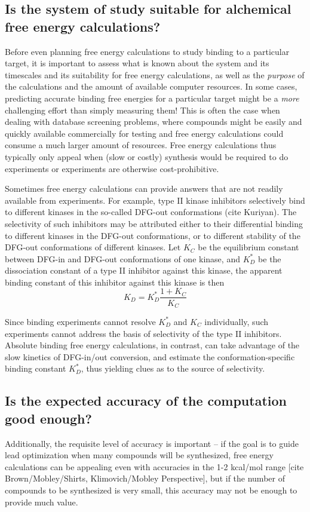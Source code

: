 \documentclass[9pt,bestpractices]{livecoms}
\begin{document}
\subsection{Is the system of study suitable for alchemical free energy calculations?}
Before even planning free energy calculations to study binding to a
particular target, it is important to assess what is known about the
system and its timescales and its suitability for free energy
calculations, as well as the \emph{purpose} of the calculations and
the amount of available computer resources. In some cases, predicting
accurate binding free energies for a particular target might be a
\emph{more} challenging effort than simply measuring them! This is
often the case when dealing with database screening problems, where
compounds might be easily and quickly available commercially for
testing and free energy calculations could consume a much larger
amount of resources. Free energy calculations thus typically only
appeal when (slow or costly) synthesis would be required to do
experiments or experiments are otherwise cost-prohibitive.

Sometimes free energy calculations can provide answers that are not
readily available from experiments.  For example, type II kinase
inhibitors selectively bind to different kinases in the so-called
DFG-out conformations (cite Kuriyan).  The selectivity of such
inhibitors may be attributed either to their differential binding to
different kinases in the DFG-out conformations, or to different
stability of the DFG-out conformations of different kinases.  Let
$K_C$ be the equilibrium constant between DFG-in and DFG-out
conformations of one kinase, and $K_D^\ast$ be the dissociation
constant of a type II inhibitor against this kinase, the apparent
binding constant of this inhibitor against this kinase is then
\begin{equation}
  K_D = K_D^\ast \frac{1 + K_C}{K_C}
  \label{eqn:conformational-binding}
\end{equation}

Since binding experiments cannot resolve $K_D^\ast$ and $K_C$ individually,
such experiments cannot address the basis of selectivity of the type II
inhibitors.  Absolute binding free energy calculations, in contrast, can
take advantage of the slow kinetics of DFG-in/out conversion, and estimate the
conformation-specific binding constant $K_D^\ast$, thus yielding clues as
to the source of selectivity.

\subsection{Is the expected accuracy of the computation good enough?}
Additionally, the requisite level of accuracy is important -- if the
goal is to guide lead optimization when many compounds will be
synthesized, free energy calculations can be appealing even with
accuracies in the 1-2 kcal/mol range [cite Brown/Mobley/Shirts,
  Klimovich/Mobley Perspective], but if the number of compounds to be
synthesized is very small, this accuracy may not be enough to provide
much value.
\end{document}
